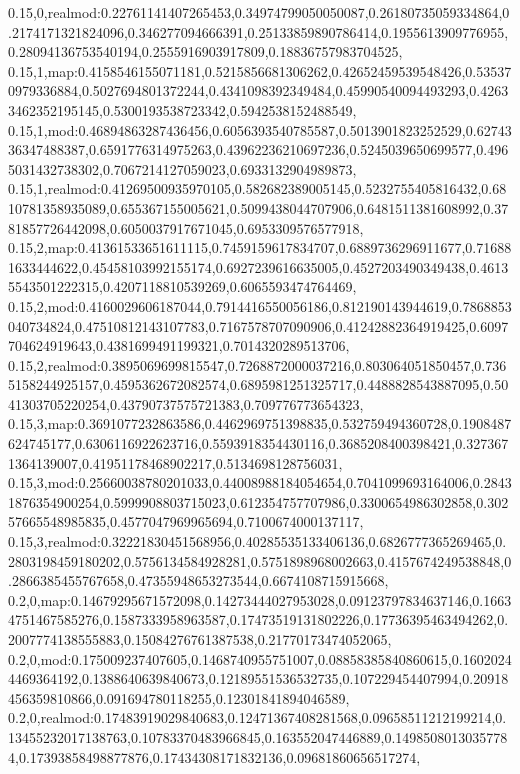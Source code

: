 0.15,0,realmod:0.22761141407265453,0.34974799050050087,0.26180735059334864,0.2174171321824096,0.346277094666391,0.25133859890786414,0.1955613909776955,0.28094136753540194,0.2555916903917809,0.18836757983704525,
0.15,1,map:0.4158546155071181,0.5215856681306262,0.42652459539548426,0.535370979336884,0.5027694801372244,0.4341098392349484,0.45990540094493293,0.42633462352195145,0.5300193538723342,0.5942538152488549,
0.15,1,mod:0.46894863287436456,0.6056393540785587,0.5013901823252529,0.6274336347488387,0.6591776314975263,0.43962236210697236,0.5245039650699577,0.4965031432738302,0.7067214127059023,0.6933132904989873,
0.15,1,realmod:0.41269500935970105,0.582682389005145,0.5232755405816432,0.6810781358935089,0.655367155005621,0.5099438044707906,0.6481511381608992,0.3781857726442098,0.6050037917671045,0.6953309576577918,
0.15,2,map:0.41361533651611115,0.7459159617834707,0.6889736296911677,0.716881633444622,0.45458103992155174,0.6927239616635005,0.4527203490349438,0.46135543501222315,0.4207118810539269,0.6065593474764469,
0.15,2,mod:0.4160029606187044,0.7914416550056186,0.812190143944619,0.7868853040734824,0.47510812143107783,0.7167578707090906,0.41242882364919425,0.6097704624919643,0.4381699491199321,0.7014320289513706,
0.15,2,realmod:0.3895069699815547,0.7268872000037216,0.803064051850457,0.7365158244925157,0.4595362672082574,0.6895981251325717,0.4488828543887095,0.5041303705220254,0.43790737575721383,0.709776773654323,
0.15,3,map:0.3691077232863586,0.4462969751398835,0.532759494360728,0.1908487624745177,0.6306116922623716,0.5593918354430116,0.3685208400398421,0.3273671364139007,0.41951178468902217,0.5134698128756031,
0.15,3,mod:0.25660038780201033,0.44008988184054654,0.7041099693164006,0.28431876354900254,0.5999908803715023,0.612354757707986,0.3300654986302858,0.30257665548985835,0.4577047969965694,0.7100674000137117,
0.15,3,realmod:0.32221830451568956,0.40285535133406136,0.6826777365269465,0.2803198459180202,0.5756134584928281,0.5751898968002663,0.4157674249538848,0.2866385455767658,0.47355948653273544,0.6674108715915668,
0.2,0,map:0.14679295671572098,0.14273444027953028,0.09123797834637146,0.16634751467585276,0.1587333958963587,0.17473519131802226,0.17736395463494262,0.2007774138555883,0.15084276761387538,0.21770173474052065,
0.2,0,mod:0.175009237407605,0.1468740955751007,0.08858385840860615,0.16020244469364192,0.1388640639840673,0.12189551536532735,0.107229454407994,0.20918456359810866,0.091694780118255,0.12301841894046589,
0.2,0,realmod:0.17483919029840683,0.12471367408281568,0.09658511212199214,0.13455232017138763,0.10783370483966845,0.163552047446889,0.14985080130357784,0.17393858498877876,0.17434308171832136,0.09681860656517274,
